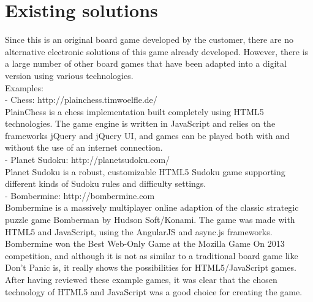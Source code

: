 \section{Existing solutions}
Since this is an original board game developed by the customer, there are no alternative electronic solutions of this game already developed. However, there is a large number of other board games that have been adapted into a digital version using various technologies.\\

Examples:\\
- Chess: http://plainchess.timwoelfle.de/\\
PlainChess is a chess implementation built completely using HTML5 technologies. The game engine is written in JavaScript and relies on the frameworks jQuery and jQuery UI, and games can be played both with and without the use of an internet connection.\\

- Planet Sudoku: http://planetsudoku.com/\\
Planet Sudoku is a robust, customizable HTML5 Sudoku game supporting different kinds of Sudoku rules and difficulty settings.\\

- Bombermine: http://bombermine.com\\
Bombermine is a massively multiplayer online adaption of the classic strategic puzzle game Bomberman by Hudson Soft/Konami. The game was made with HTML5 and JavaScript, using the AngularJS and async.js frameworks. Bombermine won the Best Web-Only Game at the Mozilla Game On 2013 competition, and although it is not as similar to a traditional board game like Don’t Panic is, it really shows the possibilities for HTML5/JavaScript games.\\

After having reviewed these example games, it was clear that the chosen technology of HTML5 and JavaScript was a good choice for creating the game.\\

